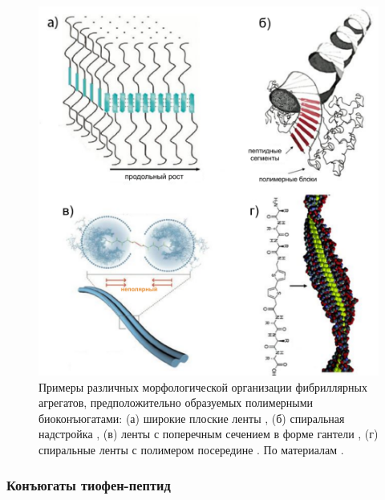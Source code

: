 \begin{figure} [H]
    \centering
    \includegraphics[width=\textwidth]{images/p4/punkt1/part4_p1_f6.pdf}
    \caption[Примеры различных морфологической организации фибриллярных агрегатов, предположительно образуемых полимерными биоконъюгатами]{Примеры различных морфологической организации фибриллярных агрегатов, предположительно образуемых полимерными биоконъюгатами: (а) широкие плоские ленты \cite{hentschel_switch-peptides_2006}, (б) спиральная надстройка \cite{hentschel_peptide-directed_2006}, (в) ленты с поперечным сечением в форме гантели \cite{frauenrath_general_2008}, (г) спиральные ленты с полимером посередине \cite{diegelmann_one-dimensional_2008}. По материалам \cite{diegelmann_one-dimensional_2008,hentschel_switch-peptides_2006,hentschel_peptide-directed_2006,frauenrath_general_2008}.}
    \label{fig:p4_p1_f6}
\end{figure}



\subsubsection{Конъюгаты тиофен-пептид}

